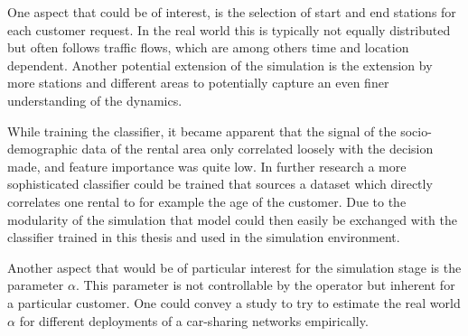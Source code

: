 One aspect that could be of interest, is the selection of start and end stations for
each customer request. In the real world this is typically not equally distributed but
often follows traffic flows, which are among others time and location dependent.
Another potential extension of the simulation is the extension by more stations and different
areas to potentially capture an even finer understanding of the dynamics.

While training the classifier, it became apparent that the signal of the socio-demographic
data of the rental area only correlated loosely with the decision made, and feature importance
was quite low. In further research a more sophisticated classifier could be trained that
sources a dataset which directly correlates one rental to for example the age of the
customer. Due to the modularity of the simulation that model could then easily be
exchanged with the classifier trained in this thesis and used in the simulation 
environment. 

Another aspect that would be of particular interest for the simulation stage is the parameter
$\alpha$. This parameter is not controllable by the operator but inherent for a particular
customer. One could convey a study to try to estimate the real world $\alpha$ for different
deployments of a car-sharing networks empirically.
